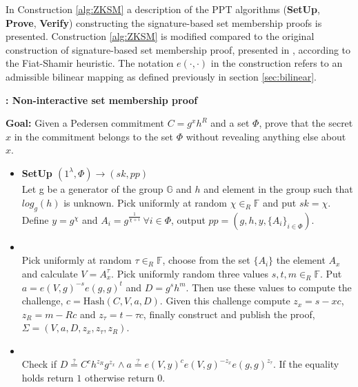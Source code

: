 In Construction \ref{alg:ZKSM} a description of the  PPT algorithms (\textbf{SetUp}, \textbf{Prove}, \textbf{Verify}) constructing the signature-based set membership proofs is presented. Construction \ref{alg:ZKSM} is modified compared to the original construction of signature-based set membership proof, presented in \cite{RANGE-SET}, according to the Fiat-Shamir heuristic. The notation $e(\cdot,\cdot)$ in the construction refers to an admissible bilinear mapping as defined previously in section \ref{sec:bilinear}.
\begin{algorithm}[]
\caption{\textbf{: Non-interactive set membership proof}}
\textbf{Goal:} Given a Pedersen commitment $C=g^x h^R$ and a set $\Phi$, prove that the secret $x$ in the commitment belongs to the set $\Phi$ without revealing anything else about $x$.
\vspace{2pt} \hline \vspace{2pt}
\begin{itemize}
  \item\textbf{SetUp $(1^{\lambda}, \Phi)\xrightarrow[]{}(sk,pp)$}\\
 Let g be a generator of the group $\mathds{G}$ and $h$ and element in the group such that $log_g(h)$ is unknown.  
Pick uniformly at random $\chi\in_R\mathds{F}$ and put $sk=\chi$. Define $y=g^\chi$ and $A_i=g^{\frac{1}{\chi+i}} \:\forall i\in\Phi$, output $pp=(g,h,y,\{A_i\}_{i\in\Phi})$.

\item{}\\
Pick uniformly at random $\tau\in_R\mathds{F}$, choose from the set $\{A_i\}$ the element $A_x$ and calculate $V=A_x^\tau$. Pick uniformly random three values $s,t,m\in_R\mathds{F}$. Put $a=e(V,g)^{-s}e(g,g)^t$ and $D=g^sh^m$. Then use these values to compute the challenge, $c=\text{Hash}(C,V,a,D)$. Given this challenge compute $z_x = s-x c$, $z_R = m-Rc$ and $z_\tau= t-\tau c$, finally construct and publish the proof, $\Sigma = (V,a,D,z_x,z_\tau,z_R)$.

\item{}\\
Check if $D\overset{?}{=}C^ch^{z_R}g^{z_x}\wedge a \overset{?}{=} e(V,y)^c e(V,g)^{-z_x}e(g,g)^{z_\tau}$. If the equality holds return $1$ otherwise return $0$.
\end{itemize}
\label{alg:ZKSM}
\end{algorithm}

